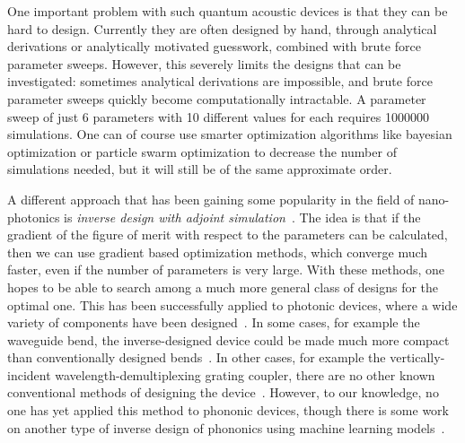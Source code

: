One important problem with such quantum acoustic devices is that they can be hard to design.
Currently they are often designed by hand,
through analytical derivations or analytically motivated guesswork,
combined with brute force parameter sweeps.
However, this severely limits the designs that can be investigated:
sometimes analytical derivations are impossible, and brute force parameter
sweeps quickly become computationally intractable.
A parameter sweep of just 6 parameters with 10 different values for each
requires \num{1000000} simulations.
One can of course use smarter optimization algorithms like bayesian optimization
or particle swarm optimization\cite{schneider2019benchmarking,zhang_compact_2013}
to decrease the number of simulations needed, but it will still be of the
same approximate order.

A different approach that has been gaining some popularity in the field of
nano-photonics is \emph{inverse design with adjoint
simulation}~\cite{molesky_inverse_2018}.
The idea is that if the gradient of the figure of merit
with respect to the parameters can be calculated, then we can use gradient based
optimization methods, which converge much faster, even if the number of
parameters is very large. With these methods, one hopes to be able to search
among a much more general class of designs for the optimal one.
This has been successfully applied to photonic devices,
where a wide variety of components have been designed~\cite{spins2019}.
In some cases, for example the waveguide bend, the inverse-designed device could
be made much more compact than conventionally designed
bends~\cite{jensen_systematic_2004}.
In other cases, for example the vertically-incident wavelength-demultiplexing
grating coupler, there are no other known conventional methods of designing the
device~\cite{piggott_inverse_2014}.
However, to our knowledge, no one has yet applied this method to phononic
devices, though there is some work on another type of inverse design of
phononics using machine learning models~\cite{han_deep-learning-based_2022}.


